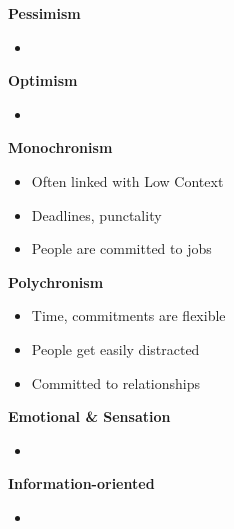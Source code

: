 \documentclass[11pt,a4paper,oneside,french,svgnames]{report}
\begin{document}
\begin{center}
\begin{minipage}[t]{.45\textwidth}
\centering\textbf{Pessimism}\\
  \begin{itemize}
    \item
  \end{itemize}
\end{minipage}
\begin{minipage}[t]{.45\textwidth}
\centering\textbf{Optimism}\\
  \begin{itemize}
    \item
  \end{itemize}
\end{minipage}

\begin{minipage}[t]{.45\textwidth}
\centering\textbf{Monochronism}\\
  \begin{itemize}
    \item Often linked with Low Context
    \item Deadlines, punctality
    \item People are committed to jobs
  \end{itemize}
\end{minipage}
\begin{minipage}[t]{.45\textwidth}
\centering\textbf{Polychronism}\\
  \begin{itemize}
    \item Time, commitments are flexible
    \item People get easily distracted
    \item Committed to relationships
  \end{itemize}
\end{minipage}

\begin{minipage}[t]{.45\textwidth}
\centering\textbf{Emotional \& Sensation}\\
  \begin{itemize}
    \item
  \end{itemize}
\end{minipage}
\begin{minipage}[t]{.45\textwidth}
\centering\textbf{Information-oriented}\\
  \begin{itemize}
    \item
  \end{itemize}
\end{minipage}


\end{center}
\end{document}
